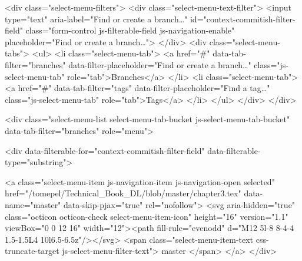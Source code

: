       <div class="select-menu-filters">
        <div class="select-menu-text-filter">
          <input type="text" aria-label="Find or create a branch…" id="context-commitish-filter-field" class="form-control js-filterable-field js-navigation-enable" placeholder="Find or create a branch…">
        </div>
        <div class="select-menu-tabs">
          <ul>
            <li class="select-menu-tab">
              <a href="#" data-tab-filter="branches" data-filter-placeholder="Find or create a branch…" class="js-select-menu-tab" role="tab">Branches</a>
            </li>
            <li class="select-menu-tab">
              <a href="#" data-tab-filter="tags" data-filter-placeholder="Find a tag…" class="js-select-menu-tab" role="tab">Tags</a>
            </li>
          </ul>
        </div>
      </div>

      <div class="select-menu-list select-menu-tab-bucket js-select-menu-tab-bucket" data-tab-filter="branches" role="menu">

        <div data-filterable-for="context-commitish-filter-field" data-filterable-type="substring">


            <a class="select-menu-item js-navigation-item js-navigation-open selected"
               href="/tomepel/Technical_Book_DL/blob/master/chapter3.tex"
               data-name="master"
               data-skip-pjax="true"
               rel="nofollow">
              <svg aria-hidden="true" class="octicon octicon-check select-menu-item-icon" height="16" version="1.1" viewBox="0 0 12 16" width="12"><path fill-rule="evenodd" d="M12 5l-8 8-4-4 1.5-1.5L4 10l6.5-6.5z"/></svg>
              <span class="select-menu-item-text css-truncate-target js-select-menu-filter-text">
                master
              </span>
            </a>
        </div>

